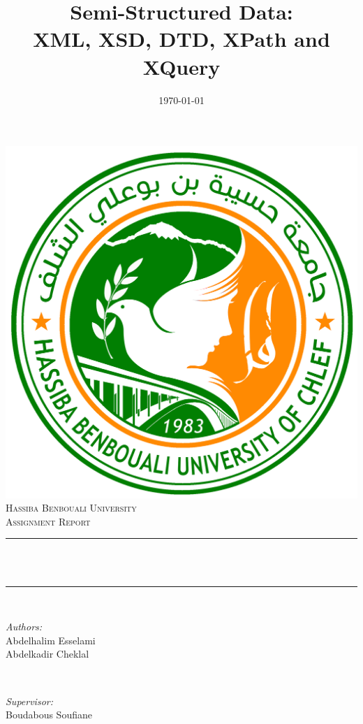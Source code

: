 \documentclass[12pt]{report}
\date{\today}
\title{\Large Semi-Structured Data: \\ XML, XSD, DTD, XPath and XQuery}
\begin{document}
\begin{titlepage}
    \centering
    \vspace*{0.5cm}
    \includegraphics[scale=0.2]{university-logo.png}\\[1.0cm]	
    \textsc{\LARGE Hassiba Benbouali University}\\[2.0cm]	
	\textsc{\Large Assignment Report}\\[0.5cm]				
	\rule{\linewidth}{0.2mm} \\[0.4cm]
	{\huge \bfseries \thetitle \\[0.4cm] }
	\rule{\linewidth}{0.2mm} \\[1.5cm]
	
	\begin{minipage}{0.4\textwidth}
		\begin{flushleft} \large
			\emph{Authors:}\\
			Abdelhalim Esselami \\
			Abdelkadir Cheklal
		\end{flushleft}
	\end{minipage}~
	\begin{minipage}{0.4\textwidth}
		\begin{flushright} \large
			\emph{Supervisor:} \\
			Boudabous Soufiane							
		\end{flushright}
	\end{minipage}\\[2cm]
	
	{\large \thedate}\\[2cm]
	
	\vfill
\end{titlepage}
\end{document}
